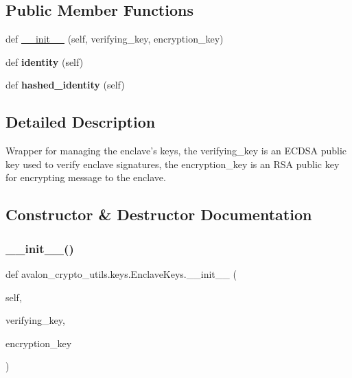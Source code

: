 \subsection*{Public Member Functions}
\begin{DoxyCompactItemize}
\item 
def \hyperlink{classavalon__crypto__utils_1_1keys_1_1EnclaveKeys_a94fcd75541e7477defe36ff55472d836}{\+\_\+\+\_\+init\+\_\+\+\_\+} (self, verifying\+\_\+key, encryption\+\_\+key)
\item 
\mbox{\label{classavalon__crypto__utils_1_1keys_1_1EnclaveKeys_a7bcd32f02025b4dc22f8388814651686}} 
def {\bfseries identity} (self)
\item 
\mbox{\label{classavalon__crypto__utils_1_1keys_1_1EnclaveKeys_ad373576d2ab5ac0c5209583e75b2d47e}} 
def {\bfseries hashed\+\_\+identity} (self)
\end{DoxyCompactItemize}


\subsection{Detailed Description}
\begin{DoxyVerb}Wrapper for managing the enclave's keys, the verifying_key is an
ECDSA public key used to verify enclave signatures, the
encryption_key is an RSA public key for encrypting message to the
enclave.
\end{DoxyVerb}
 

\subsection{Constructor \& Destructor Documentation}
\mbox{\label{classavalon__crypto__utils_1_1keys_1_1EnclaveKeys_a94fcd75541e7477defe36ff55472d836}} 
\subsubsection{\texorpdfstring{\+\_\+\+\_\+init\+\_\+\+\_\+()}{\_\_init\_\_()}}
{\footnotesize\ttfamily def avalon\+\_\+crypto\+\_\+utils.\+keys.\+Enclave\+Keys.\+\_\+\+\_\+init\+\_\+\+\_\+ (\begin{DoxyParamCaption}\item[{}]{self,  }\item[{}]{verifying\+\_\+key,  }\item[{}]{encryption\+\_\+key }\end{DoxyParamCaption})}

